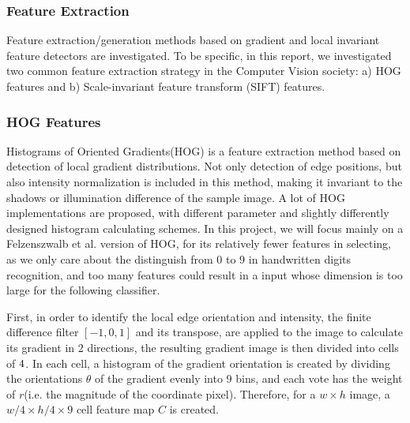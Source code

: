 \documentclass[12pt]{article}
\begin{document}
\subsubsection{Feature Extraction}
Feature extraction/generation methods based on gradient and local invariant feature detectors are investigated. To be specific, in this report, we investigated two common feature extraction strategy in the Computer Vision society: a) HOG features and b) Scale-invariant feature transform (SIFT) features.

\subsubsection*{HOG Features}
 Histograms of Oriented Gradients(HOG)\cite{dalal2005histograms}\cite{felzenszwalb2010object} is a feature extraction method based on detection of local gradient distributions. Not only detection of edge positions, but also intensity normalization is included in this method, making it invariant to the shadows or illumination difference of the sample image. A lot of HOG implementations are proposed, with different parameter and slightly differently designed histogram calculating schemes. In this project, we will focus mainly on a Felzenszwalb et al.\cite{felzenszwalb2010object} version of HOG, for its relatively fewer features in selecting, as we only care about the distinguish from 0 to 9 in handwritten digits recognition, and too many features could result in a input whose dimension is too large for the following classifier.

First, in order to identify the local edge orientation and intensity, the finite difference filter $[-1,0,1]$ and its transpose, are applied to the image to calculate its gradient in 2 directions, the resulting gradient image is then divided into cells of $4\time4$. In each cell, a histogram of the gradient orientation is created by dividing the orientations $\theta$ of the gradient evenly into 9 bins, and each vote has the weight of $r$(i.e. the magnitude of the coordinate pixel). Therefore, for a $ w\times h$ image,  a $w/4 \times h/4 \times 9$ cell feature map $C$ is created. 
\end{document}

